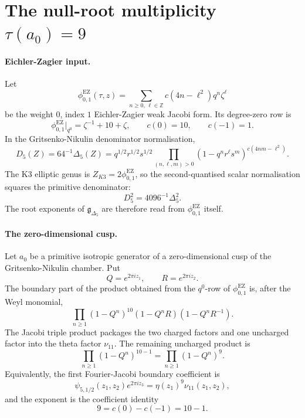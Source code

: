 \providecommand{\kch}{\kappa_{\mathrm{ch}}}
\providecommand{\kBKM}{\kappa_{\mathrm{BKM}}}
\providecommand{\kcat}{\kappa_{\mathrm{cat}}}
\providecommand{\kfib}{\kappa_{\mathrm{fiber}}}
\providecommand{\kHeis}{\kappa_{\mathrm{ch}}^{\mathrm{Heis}}}

\section*{The null-root multiplicity \texorpdfstring{\(\tau(a_0)=9\)}{tau(a0)=9}}

\paragraph{Eichler-Zagier input.}
Let
\[
 \phi_{0,1}^{\mathrm{EZ}}(\tau,z)
 = \sum_{n\geq 0,\,\ell\in\mathbb Z} c(4n-\ell^2)q^n\zeta^\ell
\]
be the weight \(0\), index \(1\) Eichler-Zagier weak Jacobi form.  Its
degree-zero row is
\[
 \phi_{0,1}^{\mathrm{EZ}}\big|_{q^0}
 = \zeta^{-1}+10+\zeta ,
 \qquad c(0)=10,\qquad c(-1)=1 .
\]
In the Gritsenko-Nikulin denominator normalisation,
\[
 D_5(Z)=64^{-1}\Delta_5(Z)
 = q^{1/2}r^{1/2}s^{1/2}
   \prod_{(n,\ell,m)>0}(1-q^n r^\ell s^m)^{c(4nm-\ell^2)} .
\]
The K3 elliptic genus is \(Z_{K3}=2\phi_{0,1}^{\mathrm{EZ}}\), so the
second-quantised scalar normalisation squares the primitive denominator:
\[
 D_5^2=4096^{-1}\Delta_5^2 .
\]
The root exponents of \(\mathfrak g_{\Delta_5}\) are therefore read from
\(\phi_{0,1}^{\mathrm{EZ}}\) itself.

\paragraph{The zero-dimensional cusp.}
Let \(a_0\) be a primitive isotropic generator of a zero-dimensional cusp
of the Gritsenko-Nikulin chamber.  Put
\[
 Q=e^{2\pi i z_1},\qquad R=e^{2\pi i z_2}.
\]
The boundary part of the product obtained from the \(q^0\)-row of
\(\phi_{0,1}^{\mathrm{EZ}}\) is, after the Weyl monomial,
\[
 \prod_{n\geq 1}
 (1-Q^n)^{10}
 (1-Q^n R)
 (1-Q^n R^{-1}) .
\]
The Jacobi triple product packages the two charged factors and one
uncharged factor into the theta factor \(\nu_{11}\).  The remaining
uncharged product is
\[
 \prod_{n\geq 1}(1-Q^n)^{10-1}
 = \prod_{n\geq 1}(1-Q^n)^9 .
\]
Equivalently, the first Fourier-Jacobi boundary coefficient is
\[
 \psi_{5,1/2}(z_1,z_2)e^{2\pi iz_3}
 = \eta(z_1)^9\nu_{11}(z_1,z_2),
\]
and the exponent is the coefficient identity
\[
 9=c(0)-c(-1)=10-1 .
\]

